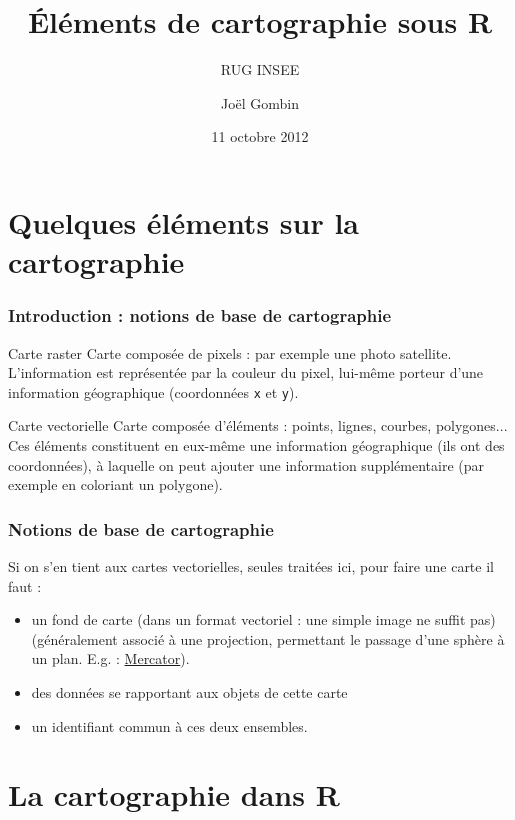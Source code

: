 \documentclass[slidetop, 10pt]{beamer}\usepackage{graphicx, color}
\title{Éléments de cartographie sous R}
\subtitle{RUG INSEE}
\author{Joël Gombin}
\institute{CURAPP - UPJV}
\date{11 octobre 2012}
\begin{document}
\frame{\titlepage}

\section{Quelques éléments sur la cartographie}

\begin{frame}
\frametitle{Introduction : notions de base de cartographie}



\begin{block}{Carte raster}
Carte composée de pixels : par exemple une photo satellite. L'information est représentée par la couleur du pixel, lui-même porteur d'une information géographique (coordonnées \verb!x! et \verb!y!).
\end{block}

\begin{block}{Carte vectorielle}
Carte composée d'éléments : points, lignes, courbes, polygones... Ces éléments constituent en eux-même une information géographique (ils ont des coordonnées), à laquelle on peut  ajouter une information supplémentaire (par exemple en coloriant un polygone).
\end{block}

\end{frame}

\begin{frame}
\frametitle{Notions de base de cartographie}

Si on s'en tient aux cartes vectorielles, seules traitées ici, pour faire une carte il faut :

\begin{itemize}
\item un fond de carte (dans un format vectoriel : une simple image ne suffit pas) (généralement associé à une projection, permettant le passage d'une sphère à un plan. E.g. : \href{http://geekisawesome.com/1865/what-map-projections-say-about-you/}{Mercator}).
\item des données se rapportant aux objets de cette carte
\item un identifiant commun à ces deux ensembles.
\end{itemize}

\end{frame}


\section{La cartographie dans R}
\end{document}
